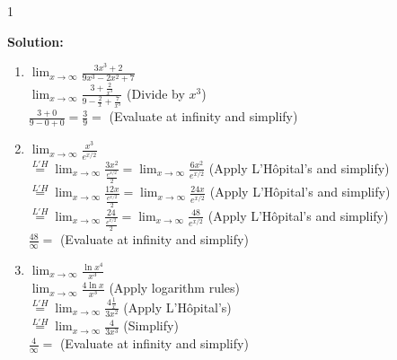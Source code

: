 \documentclass[9pt]{article}
\def\solutions{1}
\begin{document}
\if\solutions1
\vspace{2mm}

\textbf{Solution:} \\

\begin{enumerate}
	\item 
		$ \displaystyle \lim_{x \to \infty} \frac{3x^3 + 2}{9x^3 - 2x^2 +7}$ \\
		$ \displaystyle \lim_{x \to \infty} \frac{3 + \frac{2}{x^3}}{9 - \frac{2}{x} + \frac{7}{x^3}} $ \hfill (Divide by $x^3$)\\
		$ \displaystyle \frac{3 + 0}{9 - 0 + 0 } = \frac{3}{9} = $  \hfill (Evaluate at infinity and simplify)
	\item 
		$ \displaystyle \lim_{x \to \infty} \frac{x^3}{e^{x/2}} $ \\
		$ \displaystyle \stackrel{L'H}{=} \lim_{x \to \infty} \frac{3x^2}{\frac{e^{x/2}}{2}} =  \lim_{x \to \infty} \frac{6x^2}{e^{x/2}}$ \hfill (Apply L'Hôpital's and simplify)\\ 
		$ \displaystyle \stackrel{L'H}{=} \lim_{x \to \infty} \frac{12x}{\frac{e^{x/2}}{2}}  =  \lim_{x \to \infty} \frac{24x}{e^{x/2}}$ \hfill (Apply L'Hôpital's and simplify)\\
		$ \displaystyle \stackrel{L'H}{=} \lim_{x \to \infty} \frac{24}{\frac{e^{x/2}}{2}}  =  \lim_{x \to \infty} \frac{48}{e^{x/2}}$ \hfill (Apply L'Hôpital's and simplify)\\
		$ \displaystyle \frac{48}{\infty} = $ \hfill (Evaluate at infinity and simplify)
	\item
		$ \displaystyle \lim_{x \to \infty} \frac{\ln x^4}{x^3} $ \\
		$ \displaystyle \lim_{x \to \infty} \frac{4\ln x}{x^3} $ \hfill (Apply logarithm rules)\\
		$ \displaystyle \stackrel{L'H}{=} \lim_{x \to \infty} \frac{4\frac{1}{x}}{3x^2} $ \hfill (Apply L'Hôpital's)\\
		$ \displaystyle \stackrel{L'H}{=} \lim_{x \to \infty} \frac{4}{3x^3} $ \hfill (Simplify)\\
		$ \displaystyle \frac{4}{\infty} = $ \hfill (Evaluate at infinity and simplify)
\end {enumerate}
\end{document}
